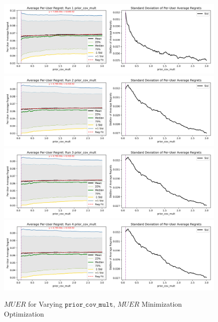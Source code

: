 	\begin{figure}[H]
	\includegraphics[width=1.1\textwidth,center]{figures/opt_param/opt_param_11100_prior_cov_mult1.png}%
	\newline
	\includegraphics[width=1.1\textwidth,center]{figures/opt_param/opt_param_11100_prior_cov_mult2.png}%
	\newline
	\includegraphics[width=1.1\textwidth,center]{figures/opt_param/opt_param_11100_prior_cov_mult3.png}%
	\newline
	\includegraphics[width=1.1\textwidth,center]{figures/opt_param/opt_param_11100_prior_cov_mult4.png}%
	\caption{$MUER$ for Varying $\mathtt{prior\_cov\_mult}$, $MUER$ Minimization Optimization}
	\end{figure}

